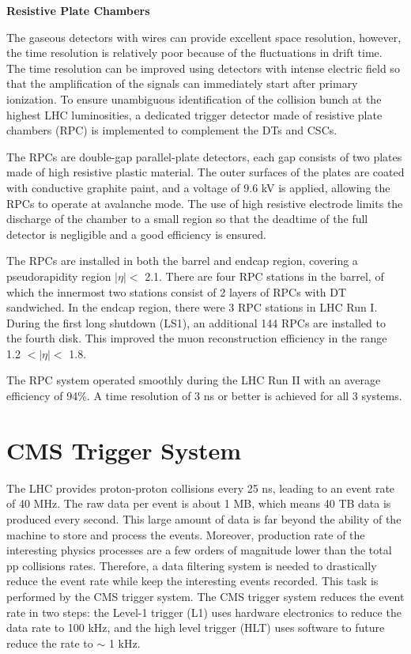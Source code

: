\documentclass[thesis.tex]{subfiles}
\begin{document}
\noindent \textbf{Resistive Plate Chambers}

The gaseous detectors with wires can provide excellent space resolution, however, the time resolution is relatively poor because of the fluctuations in drift time. 
The time resolution can be improved using detectors with intense electric field so that the amplification of the signals can immediately start after primary ionization. 
To ensure unambiguous identification of the collision bunch at the highest LHC luminosities, a dedicated trigger detector made of resistive plate chambers (RPC) is implemented to complement the DTs and CSCs.

The RPCs are double-gap parallel-plate detectors, each gap consists of two plates made of high resistive plastic material. 
The outer surfaces of the plates are coated with conductive graphite paint, and a voltage of 9.6 kV is applied, allowing the RPCs to operate at avalanche mode.
The use of high resistive electrode limits the discharge of the chamber to a small region so that the deadtime of the full detector is negligible and a good efficiency is ensured.

The RPCs are installed in both the barrel and endcap region, covering a pseudorapidity region $|\eta| <$ 2.1.
There are four RPC stations in the barrel, of which the innermost two stations consist of 2 layers of RPCs with DT sandwiched. 
In the endcap region, there were 3 RPC stations in LHC Run I. 
During the first long shutdown (LS1), an additional 144 RPCs are installed to the fourth disk. This improved the muon reconstruction efficiency in the range 1.2 $< |\eta| < $ 1.8. 

The RPC system operated smoothly during the LHC Run II with an average efficiency of 94\%. 
A time resolution of 3 ns or better is achieved for all 3 systems.


\section{CMS Trigger System}
The LHC provides proton-proton collisions every 25 ns, leading to an event rate of 40 MHz. 
The raw data per event is about 1 MB, which means 40 TB data is produced every second.  
This large amount of data is far beyond the ability of the machine to store and process the events. 
Moreover, production rate of the interesting physics processes are a few orders of magnitude lower than the total pp collisions rates. 
Therefore, a data filtering system is needed to drastically reduce the event rate while keep the interesting events recorded. 
This task is performed by the CMS trigger system.
The CMS trigger system reduces the event rate in two steps: the Level-1 trigger (L1) uses hardware electronics to reduce the data rate to 100 kHz, and the high level trigger (HLT) uses software to future reduce the rate to $\sim$ 1 kHz.\\
\end{document}

